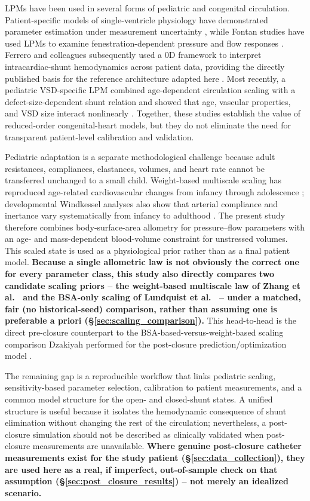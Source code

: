 \documentclass{article}
\begin{document}
LPMs have been used in several forms of pediatric and congenital circulation. Patient-specific models of single-ventricle physiology have demonstrated parameter estimation under measurement uncertainty \cite{Schiavazzi2017}, while Fontan studies have used LPMs to examine fenestration-dependent pressure and flow responses \cite{Horio2024}. Ferrero and colleagues subsequently used a 0D framework to interpret intracardiac-shunt hemodynamics across patient data, providing the directly published basis for the reference architecture adapted here \cite{Ferrero2026Shunts}. Most recently, a pediatric VSD-specific LPM combined age-dependent circulation scaling with a defect-size-dependent shunt relation and showed that age, vascular properties, and VSD size interact nonlinearly \cite{Colebank2026}. Together, these studies establish the value of reduced-order congenital-heart models, but they do not eliminate the need for transparent patient-level calibration and validation.

Pediatric adaptation is a separate methodological challenge because adult resistances, compliances, elastances, volumes, and heart rate cannot be transferred unchanged to a small child. Weight-based multiscale scaling has reproduced age-related cardiovascular changes from infancy through adolescence \cite{zhang2019multiscale}; developmental Windkessel analyses also show that arterial compliance and inertance vary systematically from infancy to adulthood \cite{Burattini2007}. The present study therefore combines body-surface-area allometry for pressure--flow parameters with an age- and mass-dependent blood-volume constraint for unstressed volumes. This scaled state is used as a physiological prior rather than as a final patient model. \textbf{Because a single allometric law is not obviously the correct one for every parameter class, this study also directly compares two candidate scaling priors -- the weight-based multiscale law of Zhang et al.\ \cite{zhang2019multiscale} and the BSA-only scaling of Lundquist et al.\ \cite{Lundquist2025} -- under a matched, fair (no historical-seed) comparison, rather than assuming one is preferable a priori (\S\ref{sec:scaling_comparison}).} This head-to-head is the direct pre-closure counterpart to the BSA-based-versus-weight-based scaling comparison Dzakiyah performed for the post-closure prediction/optimization model \cite{Dzakiyah2026Thesis}.

The remaining gap is a reproducible workflow that links pediatric scaling, sensitivity-based parameter selection, calibration to patient measurements, and a common model structure for the open- and closed-shunt states. A unified structure is useful because it isolates the hemodynamic consequence of shunt elimination without changing the rest of the circulation; nevertheless, a post-closure simulation should not be described as clinically validated when post-closure measurements are unavailable. \textbf{Where genuine post-closure catheter measurements exist for the study patient (\S\ref{sec:data_collection}), they are used here as a real, if imperfect, out-of-sample check on that assumption (\S\ref{sec:post_closure_results}) -- not merely an idealized scenario.}
\end{document}
